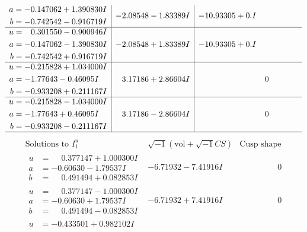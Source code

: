 \documentclass[1p]{elsarticle_modified}
\theoremstyle{definition}
\newcommand{\I}{\sqrt{-1}}
\begin{document}
$$\begin{array}{c|c|c}
\begin{aligned}
a &= -0.147062 + 1.390830 I \\
b &= -0.742542 - 0.916719 I\end{aligned}
 & -2.08548 - 1.83389 I & -10.93305 + 0. I\phantom{ +0.000000I} \\ \hline\begin{aligned}
u &= \phantom{-}0.301550 - 0.900946 I \\
a &= -0.147062 - 1.390830 I \\
b &= -0.742542 + 0.916719 I\end{aligned}
 & -2.08548 + 1.83389 I & -10.93305 + 0. I\phantom{ +0.000000I} \\ \hline\begin{aligned}
u &= -0.215828 + 1.034000 I \\
a &= -1.77643 - 0.46095 I \\
b &= -0.933208 + 0.211167 I\end{aligned}
 & \phantom{-}3.17186 + 2.86604 I & \phantom{-0.000000 } 0 \\ \hline\begin{aligned}
u &= -0.215828 - 1.034000 I \\
a &= -1.77643 + 0.46095 I \\
b &= -0.933208 - 0.211167 I\end{aligned}
 & \phantom{-}3.17186 - 2.86604 I & \phantom{-0.000000 } 0\\
 \hline 
 \end{array}$$\newpage$$\begin{array}{c|c|c}  
\text{Solutions to }I^u_{1}& \I (\text{vol} + \sqrt{-1}CS) & \text{Cusp shape}\\
 \hline 
\begin{aligned}
u &= \phantom{-}0.377147 + 1.000300 I \\
a &= -0.60630 - 1.79537 I \\
b &= \phantom{-}0.491494 + 0.082853 I\end{aligned}
 & -6.71932 - 7.41916 I & \phantom{-0.000000 } 0 \\ \hline\begin{aligned}
u &= \phantom{-}0.377147 - 1.000300 I \\
a &= -0.60630 + 1.79537 I \\
b &= \phantom{-}0.491494 - 0.082853 I\end{aligned}
 & -6.71932 + 7.41916 I & \phantom{-0.000000 } 0 \\ \hline\begin{aligned}
u &= -0.433501 + 0.982102 I \\

\end{aligned}
\end{array}$$
\end{document}
